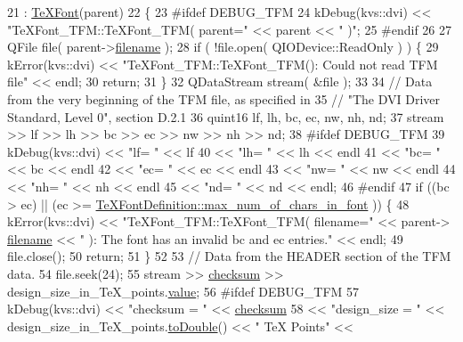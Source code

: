 \begin{DoxyCode}
21   : \hyperlink{classTeXFont_ac61cef23719a7d5e79b1c7fa09935b35}{TeXFont}(parent)
22 \{
23 \textcolor{preprocessor}{#ifdef DEBUG\_TFM}
24   kDebug(kvs::dvi) << \textcolor{stringliteral}{"TeXFont\_TFM::TeXFont\_TFM( parent="} << parent << \textcolor{stringliteral}{" )"};
25 \textcolor{preprocessor}{#endif}
26 
27   QFile file( parent->\hyperlink{classTeXFontDefinition_a28d5b98d97711686c6bc0e8df3bc9cc6}{filename} );
28   \textcolor{keywordflow}{if} ( !file.open( QIODevice::ReadOnly ) ) \{
29     kError(kvs::dvi) << \textcolor{stringliteral}{"TeXFont\_TFM::TeXFont\_TFM(): Could not read TFM file"} << endl;
30     \textcolor{keywordflow}{return};
31   \}
32   QDataStream stream( &file );
33 
34   \textcolor{comment}{// Data from the very beginning of the TFM file, as specified in}
35   \textcolor{comment}{// "The DVI Driver Standard, Level 0", section D.2.1}
36   quint16 lf, lh, bc, ec, nw, nh, nd;
37   stream >> lf >> lh >> bc >> ec >> nw >> nh >> nd;
38 \textcolor{preprocessor}{#ifdef DEBUG\_TFM}
39   kDebug(kvs::dvi) << \textcolor{stringliteral}{"lf= "} << lf
40                 << \textcolor{stringliteral}{"lh= "} << lh << endl
41                 << \textcolor{stringliteral}{"bc= "} << bc << endl
42                 << \textcolor{stringliteral}{"ec= "} << ec << endl
43                 << \textcolor{stringliteral}{"nw= "} << nw << endl
44                 << \textcolor{stringliteral}{"nh= "} << nh << endl
45                 << \textcolor{stringliteral}{"nd= "} << nd << endl;
46 \textcolor{preprocessor}{#endif}
47   \textcolor{keywordflow}{if} ((bc > ec) || (ec >= \hyperlink{classTeXFontDefinition_a542c448736e5c591257ac3889f047d66}{TeXFontDefinition::max\_num\_of\_chars\_in\_font}
      )) \{
48     kError(kvs::dvi) << \textcolor{stringliteral}{"TeXFont\_TFM::TeXFont\_TFM( filename="} << parent->
      \hyperlink{classTeXFontDefinition_a28d5b98d97711686c6bc0e8df3bc9cc6}{filename} << \textcolor{stringliteral}{" ): The font has an invalid bc and ec entries."} << endl;
49     file.close();
50     \textcolor{keywordflow}{return};
51   \}
52 
53   \textcolor{comment}{// Data from the HEADER section of the TFM data.}
54   file.seek(24);
55   stream >> \hyperlink{classTeXFont_a7bd82a10157e19f7e7534fdc386d2421}{checksum} >> design\_size\_in\_TeX\_points.\hyperlink{classfix__word_af0db00b285e54bf5c2da670519149dc0}{value};
56 \textcolor{preprocessor}{#ifdef DEBUG\_TFM}
57   kDebug(kvs::dvi) << \textcolor{stringliteral}{"checksum    = "} << \hyperlink{classTeXFont_a7bd82a10157e19f7e7534fdc386d2421}{checksum}
58                 << \textcolor{stringliteral}{"design\_size = "} << design\_size\_in\_TeX\_points.\hyperlink{classfix__word_a6d960fb9bf343763b687a04cc3af1215}{toDouble}() << \textcolor{stringliteral}{" TeX Points"} << 

\end{DoxyCode}
